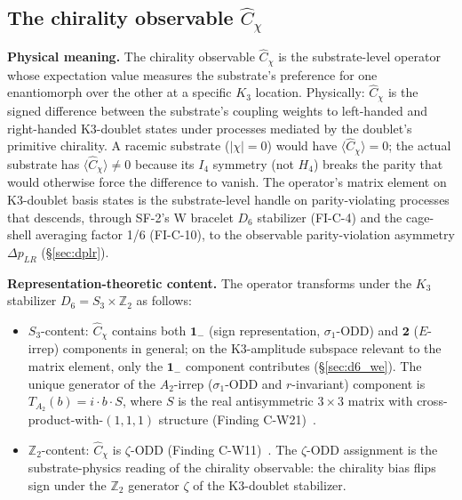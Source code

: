 \documentclass[11pt,letterpaper]{article}
\newcommand{\Kthree}{\ensuremath{K_3}}
\newcommand{\DeltapLR}{\Delta p_{LR}}
\newcommand{\Cchi}{\hat{C}_\chi}
\newcommand{\Dsix}{D_6}
\newcommand{\Sthree}{S_3}
\newcommand{\Hfour}{H_4}
\newcommand{\Ifour}{I_4}
\begin{document}
\subsection{The chirality observable $\Cchi$}\label{sec:chirality_observable}

\textbf{Physical meaning.} The chirality observable $\Cchi$ is the substrate-level operator whose expectation value measures the substrate's preference for one enantiomorph over the other at a specific $\Kthree$ location. Physically: $\Cchi$ is the signed difference between the substrate's coupling weights to left-handed and right-handed K3-doublet states under processes mediated by the doublet's primitive chirality. A racemic substrate ($|\chi| = 0$) would have $\langle \Cchi \rangle = 0$; the actual substrate has $\langle \Cchi \rangle \neq 0$ because its $\Ifour$ symmetry (not $\Hfour$) breaks the parity that would otherwise force the difference to vanish. The operator's matrix element on K3-doublet basis states is the substrate-level handle on parity-violating processes that descends, through SF-2's W bracelet $\Dsix$ stabilizer (FI-C-4) and the cage-shell averaging factor 1/6 (FI-C-10), to the observable parity-violation asymmetry $\DeltapLR$ (\S\ref{sec:dplr}).

\textbf{Representation-theoretic content.} The operator transforms under the $\Kthree$ stabilizer $\Dsix = \Sthree \times \mathbb{Z}_2$ as follows:

\begin{itemize}\setlength\itemsep{0.2em}
    \item $\Sthree$-content: $\Cchi$ contains both $\mathbf{1}_-$ (sign representation, $\sigma_1$-ODD) and $\mathbf{2}$ ($E$-irrep) components in general; on the K3-amplitude subspace relevant to the matrix element, only the $\mathbf{1}_-$ component contributes (\S\ref{sec:d6_we}). The unique generator of the $A_2$-irrep ($\sigma_1$-ODD and $r$-invariant) component is $T_{A_2}(b) = i \cdot b \cdot S$, where $S$ is the real antisymmetric $3 \times 3$ matrix with cross-product-with-$(1,1,1)$ structure (Finding C-W21)~\cite{abshier_capotauro_subclaim_c_sketch}.
    \item $\mathbb{Z}_2$-content: $\Cchi$ is $\zeta$-ODD (Finding C-W11)~\cite{abshier_capotauro_subclaim_c_sketch}. The $\zeta$-ODD assignment is the substrate-physics reading of the chirality observable: the chirality bias flips sign under the $\mathbb{Z}_2$ generator $\zeta$ of the K3-doublet stabilizer.
\end{itemize}
\end{document}
